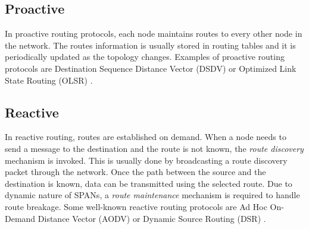 \documentclass[conference,compsoc]{IEEEtran}
\begin{document}
\subsection{Proactive}

In proactive routing protocols, each node maintains routes to every other node in the network. The routes information is usually stored in routing tables and it is periodically updated as the topology changes. \cite{routing} Examples of proactive routing protocols are Destination Sequence Distance Vector (DSDV) \cite{dsdv} or Optimized Link State Routing (OLSR) \cite{olsr}.

\subsection{Reactive}

In reactive routing, routes are established on demand. When a node needs to send a message to the destination and the route is not known, the \textit{route discovery} mechanism is invoked. This is usually done by broadcasting a route discovery packet through the network. Once the path between the source and the destination is known, data can be transmitted using the selected route. Due to dynamic nature of SPANs, a \textit{route maintenance} mechanism is required to handle route breakage.
Some well-known reactive routing protocols are Ad Hoc On-Demand Distance Vector (AODV) \cite{aodv} or Dynamic Source Routing (DSR) \cite{dsr}.





\end{document}
